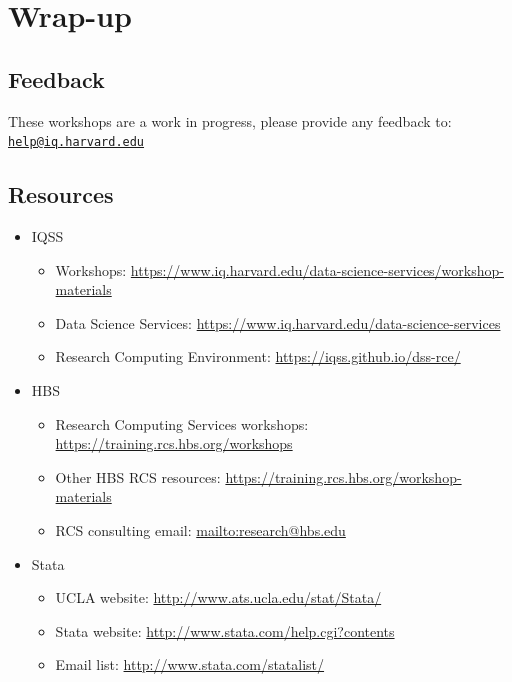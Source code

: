 \documentclass[
]{book}
\providecommand{\tightlist}{%
  \setlength{\itemsep}{0pt}\setlength{\parskip}{0pt}}
\begin{document}
\hypertarget{wrap-up-7}{%
\section{Wrap-up}\label{wrap-up-7}}

\hypertarget{feedback-7}{%
\subsection{Feedback}\label{feedback-7}}

These workshops are a work in progress, please provide any feedback to: \href{mailto:help@iq.harvard.edu}{\nolinkurl{help@iq.harvard.edu}}

\hypertarget{resources-10}{%
\subsection{Resources}\label{resources-10}}

\begin{itemize}
\tightlist
\item
  IQSS

  \begin{itemize}
  \tightlist
  \item
    Workshops: \url{https://www.iq.harvard.edu/data-science-services/workshop-materials}
  \item
    Data Science Services: \url{https://www.iq.harvard.edu/data-science-services}
  \item
    Research Computing Environment: \url{https://iqss.github.io/dss-rce/}
  \end{itemize}
\item
  HBS

  \begin{itemize}
  \tightlist
  \item
    Research Computing Services workshops: \url{https://training.rcs.hbs.org/workshops}
  \item
    Other HBS RCS resources: \url{https://training.rcs.hbs.org/workshop-materials}
  \item
    RCS consulting email: \url{mailto:research@hbs.edu}
  \end{itemize}
\item
  Stata

  \begin{itemize}
  \tightlist
  \item
    UCLA website: \url{http://www.ats.ucla.edu/stat/Stata/}
  \item
    Stata website: \url{http://www.stata.com/help.cgi?contents}
  \item
    Email list: \url{http://www.stata.com/statalist/}
  \end{itemize}
\end{itemize}
\end{document}
